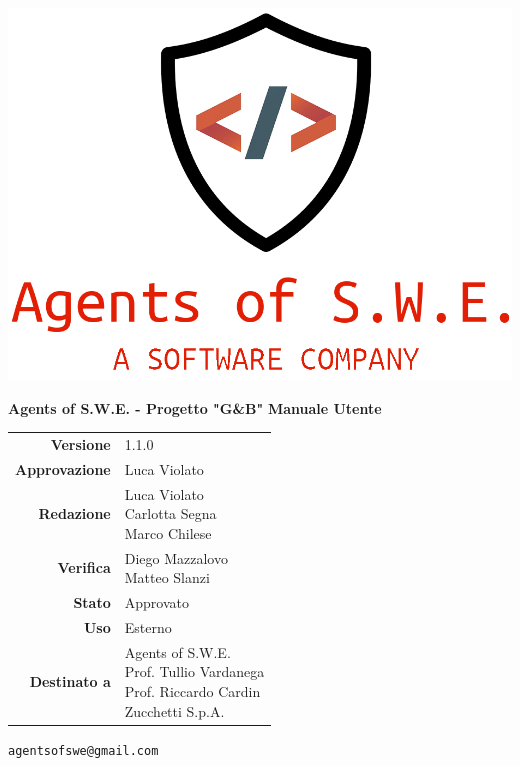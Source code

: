 


\begin{titlepage}
\thispagestyle{empty}

\begin{center}

\includegraphics[scale=0.3]{./images/logo.png} 

\large \textbf{Agents of S.W.E. - Progetto "G\&B"}
\vfill
\Huge \textbf{Manuale Utente}
\vfill
\large
\renewcommand{\arraystretch}{1.3}
\begin{tabular}{r|l}
\textbf{Versione} & 1.1.0\\
\textbf{Approvazione} & Luca Violato\\
\textbf{Redazione} & \parbox[t]{5cm}{Luca Violato\\Carlotta Segna\\Marco Chilese}\\
\textbf{Verifica} & \parbox[t]{5cm}{Diego Mazzalovo\\Matteo Slanzi}\\
\textbf{Stato} & Approvato\\
\textbf{Uso} & Esterno\\
\textbf{Destinato a} & \parbox[t]{5cm}{Agents of S.W.E. \\Prof. Tullio Vardanega\\Prof. Riccardo Cardin \\ Zucchetti S.p.A.}
\end{tabular}
\vfill
\small
\texttt{agentsofswe@gmail.com}
\end{center}
\end{titlepage}

